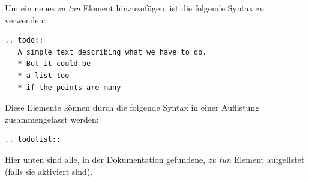 \documentclass[letterpaper,10pt,ngerman]{manual}
\begin{document}
Um ein neues \emph{zu tun} Element hinzuzufügen, ist die folgende Syntax zu verwenden:

\begin{Verbatim}[commandchars=@\[\]]
.. todo::
   A simple text describing what we have to do.
   * But it could be
   * a list too
   * if the points are many
\end{Verbatim}

Diese Elemente können durch die folgende Syntax in einer Auflistung zusammengefasst werden:

\begin{Verbatim}[commandchars=@\[\]]
.. todolist::
\end{Verbatim}

Hier unten sind alle, in der Dokumentation gefundene, \emph{zu tun} Element aufgelistet (falls sie aktiviert sind).


\renewcommand{\indexname}{Modulindex}
\printmodindex
\renewcommand{\indexname}{Stichwortverzeichnis}
\printindex
\end{document}
